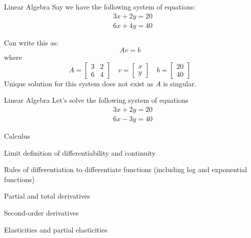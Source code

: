 \documentclass{./../../Latex/teaching_slides}
\begin{document}
\begin{frame}{Linear Algebra}
\vspace{-.5em}
Say we have the following system of equations:
$$
\begin{aligned}
& 3x+2y=20 \\
& 6 x + 4 y =40
\end{aligned}
$$

Can write this as:
$$
A v=b
$$
where
$$
A=\left[\begin{array}{cc}
3 & 2 \\
6 & 4
\end{array}\right] \quad v=\left[\begin{array}{l}
x \\
y
\end{array}\right] \quad b=\left[\begin{array}{c}
20 \\
40
\end{array}\right]
$$
Unique solution for this system does not exist as $A$ is singular.
\end{frame}

\begin{frame}{Linear Algebra}
\vspace{-.5em}
Let's solve the following system of equations $$
\begin{aligned}
& 3x+2y=20 \\
& 6 x - 3 y =40
\end{aligned}
$$

\end{frame}

\begin{frame}{Calculus}
\begin{witemize}
  \item Limit definition of differentiability and continuity
  \item Rules of differentiation to differentiate functions (including log and exponential functions)
  \item Partial and total derivatives
  \item Second-order derivatives
  \item Elasticities and partial elasticities 
\end{witemize}

\end{frame}
\end{document}
